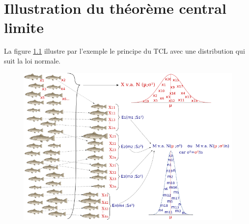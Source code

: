 \chapter{Illustration du théorème central limite} \label{appendix:clt-exemple}
La figure \ref{fig:tcl} illustre par l'exemple le principe du TCL avec une distribution qui suit la loi normale. 
\begin{figure}[H]
	\centering
	\includegraphics[width=1\linewidth]{illustrations/tcl}
	\caption{}
	\label{fig:tcl}
	
\end{figure}















